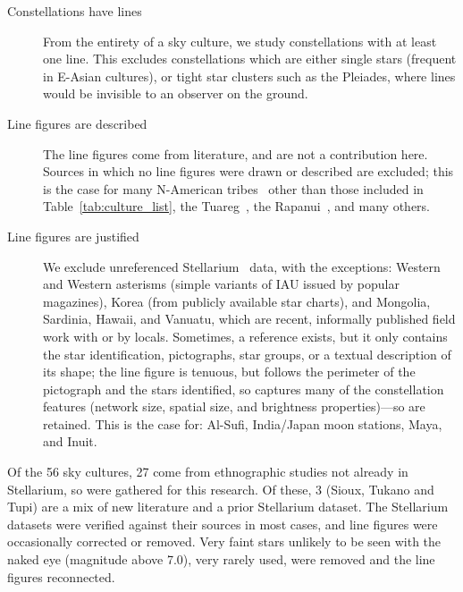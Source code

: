 \documentclass[10pt]{article}
\begin{document}
\begin{description}
	\item[Constellations have lines] From the entirety of a sky culture, we study constellations with at least one line. This excludes constellations which are either single stars (frequent in E-Asian cultures), or tight star clusters such as the Pleiades, where lines would be invisible to an observer on the ground.
	\item[Line figures are described] The line figures come from literature, and are not a contribution here. Sources in which no line figures were drawn or described are excluded; this is the case for many N-American tribes~\cite{miller1997stars} other than those included in Table~\ref{tab:culture_list}, the Tuareg~\cite{bernus1989etoiles}, the Rapanui~\cite{edwards2018consolidation}, and many others. 
	\item[Line figures are justified] We exclude unreferenced Stellarium~\cite{Stellarium} data, with the exceptions: Western and Western asterisms (simple variants of IAU issued by popular magazines), Korea (from publicly available star charts), and Mongolia, Sardinia, Hawaii, and Vanuatu, which are recent, informally published field work with or by locals. Sometimes, a reference exists, but it only contains the star identification, pictographs, star groups, or a textual description of its shape; the line figure is tenuous, but follows the perimeter of the pictograph and the stars identified, so captures many of the constellation features (network size, spatial size, and brightness properties)---so are retained. This is the case for: Al-Sufi, India/Japan moon stations, Maya, and Inuit.
\end{description}

Of the 56 sky cultures, 27 come from ethnographic studies not already in Stellarium, so were gathered for this research. Of these, 3 (Sioux, Tukano and Tupi) are a mix of new literature and a prior Stellarium dataset. The Stellarium datasets were verified against their sources in most cases, and line figures were occasionally corrected or removed. Very faint stars unlikely to be seen with the naked eye (magnitude above 7.0), very rarely used, were removed and the line figures reconnected.
\end{document}
